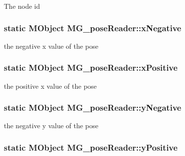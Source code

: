 The node id \hypertarget{class_m_g__pose_reader_a70a536b55c374d6fa3ee29da2d07e416}{
\subsubsection[{x\-Negative}]{\setlength{\rightskip}{0pt plus 5cm}static M\-Object M\-G\-\_\-pose\-Reader\-::x\-Negative\hspace{0.3cm}{\ttfamily [static]}}}\label{class_m_g__pose_reader_a70a536b55c374d6fa3ee29da2d07e416}
the negative x value of the pose \hypertarget{class_m_g__pose_reader_a575eb3243593993d47794ede7e56a19a}{
\subsubsection[{x\-Positive}]{\setlength{\rightskip}{0pt plus 5cm}static M\-Object M\-G\-\_\-pose\-Reader\-::x\-Positive\hspace{0.3cm}{\ttfamily [static]}}}\label{class_m_g__pose_reader_a575eb3243593993d47794ede7e56a19a}
the positive x value of the pose \hypertarget{class_m_g__pose_reader_af45e2be7873bbfd49425fb622beae3d3}{
\subsubsection[{y\-Negative}]{\setlength{\rightskip}{0pt plus 5cm}static M\-Object M\-G\-\_\-pose\-Reader\-::y\-Negative\hspace{0.3cm}{\ttfamily [static]}}}\label{class_m_g__pose_reader_af45e2be7873bbfd49425fb622beae3d3}
the negative y value of the pose \hypertarget{class_m_g__pose_reader_ad9eddeafae27cd633b869c5fc9dc4513}{
\subsubsection[{y\-Positive}]{\setlength{\rightskip}{0pt plus 5cm}static M\-Object M\-G\-\_\-pose\-Reader\-::y\-Positive\hspace{0.3cm}{\ttfamily [static]}}}\label{class_m_g__pose_reader_ad9eddeafae27cd633b869c5fc9dc4513}
